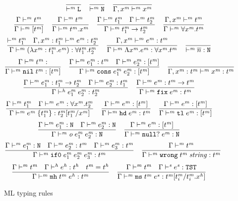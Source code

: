\begin{figure}[p]
\[
\frac
{}
{ \vdash^{\mathit{m}} \mathtt{L}}
\quad
\frac
{}
{ \vdash^{\mathit{m}} \mathtt{N}}
\quad
\frac
{}
{\Gamma , x^{\mathit{m}} \vdash^{\mathit{m}} x^{\mathit{m}}}
\]
\[
\frac
{\Gamma \vdash^{\mathit{m}} t^{\mathit{m}}}
{\Gamma \vdash^{\mathit{m}} [t^{\mathit{m}}]}
\quad
\frac
{\Gamma \vdash^{\mathit{m}} t^{\mathit{m}}}
{\Gamma \vdash^{\mathit{m}} t^{\mathit{m}} . x^{\mathit{m}}}
\quad
\frac
{\Gamma \vdash^{\mathit{m}} t^{\mathit{m}}_{1} \quad \Gamma \vdash^{\mathit{m}} t^{\mathit{m}}_{2}}
{\Gamma \vdash^{\mathit{m}} t^{\mathit{m}}_{1} \rightarrow t^{\mathit{m}}_{2}}
\quad
\frac
{\Gamma, x^{\mathit{m}} \vdash^{\mathit{m}} t^{\mathit{m}}}
{\Gamma \vdash^{\mathit{m}} \forall x^{\mathit{m}} . t^{\mathit{m}}}
\]
\bigskip
\[
\frac
{ \vdash^{\mathit{m}} t^{\mathit{m}}_{1} \quad \Gamma , x^{\mathit{m}} : t^{\mathit{m}}_{1} \vdash^{\mathit{m}} e^{\mathit{m}} : t^{\mathit{m}}_{2}}
{\Gamma \vdash^{\mathit{m}} (\lambda x^{\mathit{m}} : t^{\mathit{m}}_{1} . e^{\mathit{m}}) : \forall t^{\mathit{m}}_{1} . t^{\mathit{m}}_{2}}
\quad
\frac
{\Gamma , x^{\mathit{m}} \vdash^{\mathit{m}} e^{\mathit{m}} : t^{\mathit{m}}}
{\Gamma \vdash^{\mathit{m}} \Lambda x^{\mathit{m}} . e^{\mathit{m}} : \forall x^{\mathit{m}} . t^{\mathit{m}}}
\quad
\frac
{}
{ \vdash^{\mathit{m}} \overline{n} : \mathtt{N}}
\]
\[
\frac
{\judem{\env}{\vartym}}
{\judem{\env}{\expnils{\vartym}}{\tylist{\vartym}}}
\quad
\frac
{\judem{\env}{\first{\varexpm}}{\vartym} \quad \judem{\env}{\second{\varexpm}}{\tylist{\vartym}}}
{\judem{\env}{\expcons{\first{\varexpm}}{\second{\varexpm}}}{\tylist{\vartym}}}
\quad
\frac
{}
{\judem{\envexte{\tyvarm}{\vartym}}{\tyvarm}{\vartym}}
\]
\[
\frac
{\Gamma \vdash^{\mathit{m}} e^{\mathit{m}}_{1} : t^{\mathit{m}}_{1} \rightarrow t^{\mathit{m}}_{2} \quad \Gamma \vdash^{\mathit{m}} e^{\mathit{m}}_{2} : t^{\mathit{m}}_{1}}
{\Gamma\vdash^{\mathit{h}}e^{\mathit{m}}_{1} \; e^{\mathit{m}}_{2}:t^{\mathit{m}}_2}
\quad
\frac
{\Gamma \vdash^{\mathit{m}} e^{\mathit{m}} : t^{\mathit{m}} \rightarrow t^{\mathit{m}}}
{\Gamma \vdash^{\mathit{m}} \mathtt{fix} \; e^{\mathit{m}} : t^{\mathit{m}}}
\]
\[
\frac
{\Gamma \vdash^{\mathit{m}} t^{\mathit{m}}_{1} \quad \Gamma \vdash^{\mathit{m}} e^{\mathit{m}} : \forall x^{\mathit{m}} . t^{\mathit{m}}_{2}}
{\Gamma \vdash^{\mathit{m}} e^{\mathit{m}} \; \lbrace t^{\mathit{m}}_{1} \rbrace : t^{\mathit{m}}_{2}[t^{\mathit{m}}_{1}/x^{\mathit{m}}]}
\quad
\frac
{\Gamma \vdash^{\mathit{m}} e^{\mathit{m}} : [t^{\mathit{m}}]}
{\Gamma \vdash^{\mathit{m}} \mathtt{hd} \; e^{\mathit{m}} : t^{\mathit{m}}}
\quad
\frac
{\Gamma \vdash^{\mathit{m}} e^{\mathit{m}} : [t^{\mathit{m}}]}
{\Gamma \vdash^{\mathit{m}} \mathtt{tl} \; e^{\mathit{m}} : [t^{\mathit{m}}]}
\]
\[
\frac
{\Gamma \vdash^{\mathit{m}} e^{\mathit{m}}_{1} : \mathtt{N} \quad \Gamma \vdash^{\mathit{m}} e^{\mathit{m}}_{2} : \mathtt{N}}
{\Gamma \vdash^{\mathit{m}} \mathit{o} \; e^{\mathit{m}}_{1} \; e^{\mathit{m}}_{2} : \mathtt{N}}
\quad
\frac
{\Gamma \vdash^{\mathit{m}} e^{\mathit{m}} : [t^{\mathit{m}}]}
{\Gamma \vdash^{\mathit{m}} \mathtt{null?} \; e^{\mathit{m}} : \mathtt{N}}
\]
\[
\frac
{\Gamma \vdash^{\mathit{m}} e^{\mathit{m}}_{1} : \mathtt{N} \quad \Gamma \vdash^{\mathit{m}} e^{\mathit{m}}_{2} : t^{\mathit{m}} \quad \Gamma \vdash^{\mathit{m}} e^{\mathit{m}}_{3} : t^{\mathit{m}}}
{\Gamma \vdash^{\mathit{m}} \mathtt{if0} \; e^{\mathit{m}}_{1} \; e^{\mathit{m}}_{2} \; e^{\mathit{m}}_{3} : t^{\mathit{m}}}
\quad
\frac
{\Gamma \vdash^{\mathit{m}} t^{\mathit{m}}}
{\Gamma \vdash^{\mathit{m}} \mathtt{wrong} \; t^{\mathit{m}} \; \mathit{string} : t^{\mathit{m}}}
\]
\[
\frac
{\Gamma \vdash^{\mathit{m}} t^{\mathit{m}} \quad \Gamma \vdash^{\mathit{h}} e^{\mathit{h}} : t^{\mathit{h}} \quad t^{\mathit{m}}=t^{\mathit{h}}}
{\Gamma \vdash^{\mathit{m}} \mathtt{mh} \; t^{\mathit{m}} \; e^{\mathit{h}} : t^{\mathit{m}}}
\quad
\frac
{\Gamma \vdash^{\mathit{m}} t^{\mathit{m}} \quad \Gamma \vdash^{\mathit{s}} e^{\mathit{s}} : \mathtt{TST}}
{\Gamma \vdash^{\mathit{m}} \mathtt{ms} \; t^{\mathit{m}} \; e^{\mathit{s}} : t^{\mathit{m}}[t^{\mathit{m}}_{i}/t^{\mathit{m}}_{i} . x^{\mathit{h}}]}
\]
\caption{ML typing rules}
\label{mtr}
\end{figure}